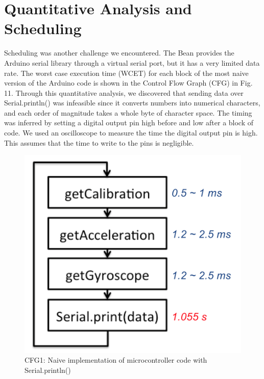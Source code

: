 \documentclass[10pt,journal]{IEEEtran}
\begin{document}
\section{Quantitative Analysis and Scheduling}
Scheduling was another challenge we encountered. The Bean provides the Arduino serial library through a virtual serial port, but it has a very limited data rate. The worst case execution time (WCET) for each block of the most naive version of the Arduino code is shown in the Control Flow Graph (CFG) in Fig. 11. Through this quantitative analysis, we discovered that sending data over Serial.println() was infeasible since it converts numbers into numerical characters, and each order of magnitude takes a whole byte of character space. The timing was inferred by setting a digital output pin high before and low after a block of code. We used an oscilloscope to measure the time the digital output pin is high. This assumes that the time to write to the pins is negligible.
\begin{figure}[h]
  \centering
    \includegraphics[width=0.6\linewidth]{figures/cfg1}
  \caption{CFG1: Naive implementation of microcontroller code with Serial.println()}
  \label{fig:cfg1}
\end{figure}
\end{document}
